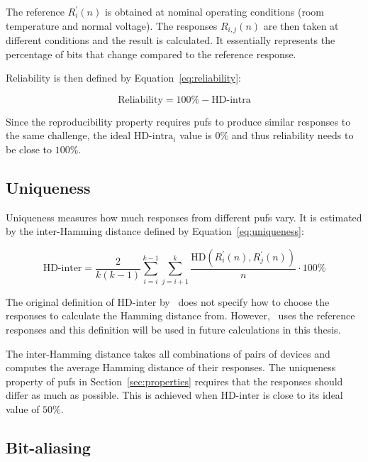 The reference $R_{i}^{'}(n)$ is obtained at nominal operating conditions (room temperature and normal voltage). The responses $R_{i, j}(n)$ are then taken at different conditions and the result is calculated. It essentially represents the percentage of bits that change compared to the reference response.

Reliability is then defined by Equation~\ref{eq:reliability}:

\begin{equation}\label{eq:reliability}
    \textrm{Reliability} = 100\% - \textrm{HD-intra}
\end{equation}

Since the reproducibility property requires \glspl{puf} to produce similar responses to the same challenge, the ideal $\textrm{HD-intra}_{i}$ value is $0\%$ and thus reliability needs to be close to $100\%$.

\subsection{Uniqueness}\label{sec:uniqueness}

Uniqueness measures how much responses from different \glspl{puf} vary. It is estimated by the inter-Hamming distance defined by Equation~\ref{eq:uniqueness}:

\begin{equation}\label{eq:uniqueness}
    \textrm{HD-inter} = \frac{2}{k(k-1)}\sum_{i=i}^{k-1} \sum_{j=i+1}^{k} \frac{\textrm{HD}(R_{i}^{'}(n),R_{j}^{'}(n))}{n} \cdot 100\%
\end{equation}

The original definition of $\textrm{HD-inter}$ by~\cite{Maiti2010} does not specify how to choose the responses to calculate the Hamming distance from. However,~\cite{Kodytek2020} uses the reference responses and this definition will be used in future calculations in this thesis.

The inter-Hamming distance takes all combinations of pairs of devices and computes the average Hamming distance of their responses. The uniqueness property of \glspl{puf} in Section~\ref{sec:properties} requires that the responses should differ as much as possible. This is achieved when $\textrm{HD-inter}$ is close to its ideal value of $50\%$.

\subsection{Bit-aliasing}\label{sec:bit_aliasing}

